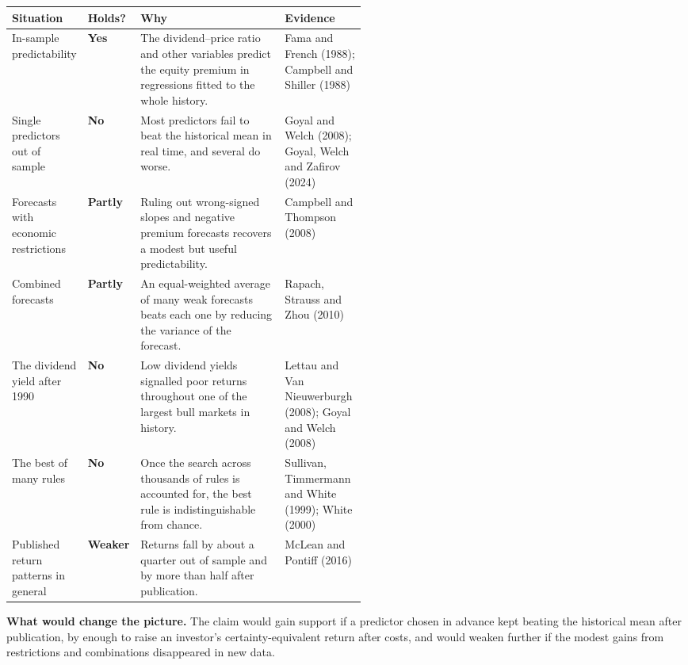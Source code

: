 \begin{center}
\small
\begin{tabularx}{\linewidth}{@{}>{\raggedright\arraybackslash}p{0.19\linewidth}>{\raggedright\arraybackslash}p{0.10\linewidth}>{\raggedright\arraybackslash}X>{\raggedright\arraybackslash}p{0.23\linewidth}@{}}
\toprule
Situation & Holds? & Why & Evidence \\
\midrule
In-sample predictability & \textbf{Yes} & The dividend--price ratio and other variables predict the equity premium in regressions fitted to the whole history. & Fama and French (1988); Campbell and Shiller (1988) \\
\addlinespace[3pt]
Single predictors out of sample & \textbf{No} & Most predictors fail to beat the historical mean in real time, and several do worse. & Goyal and Welch (2008); Goyal, Welch and Zafirov (2024) \\
\addlinespace[3pt]
Forecasts with economic restrictions & \textbf{Partly} & Ruling out wrong-signed slopes and negative premium forecasts recovers a modest but useful predictability. & Campbell and Thompson (2008) \\
\addlinespace[3pt]
Combined forecasts & \textbf{Partly} & An equal-weighted average of many weak forecasts beats each one by reducing the variance of the forecast. & Rapach, Strauss and Zhou (2010) \\
\addlinespace[3pt]
The dividend yield after 1990 & \textbf{No} & Low dividend yields signalled poor returns throughout one of the largest bull markets in history. & Lettau and Van Nieuwerburgh (2008); Goyal and Welch (2008) \\
\addlinespace[3pt]
The best of many rules & \textbf{No} & Once the search across thousands of rules is accounted for, the best rule is indistinguishable from chance. & Sullivan, Timmermann and White (1999); White (2000) \\
\addlinespace[3pt]
Published return patterns in general & \textbf{Weaker} & Returns fall by about a quarter out of sample and by more than half after publication. & McLean and Pontiff (2016) \\
\bottomrule
\end{tabularx}
\end{center}

\textbf{What would change the picture.} The claim would gain support if a predictor chosen in advance kept beating the historical mean after publication, by enough to raise an investor's certainty-equivalent return after costs, and would weaken further if the modest gains from restrictions and combinations disappeared in new data.

